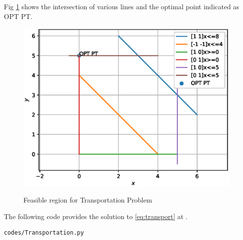 \begin{enumerate}[label=\arabic*.,ref=\thesection.\theenumi]
Fig  \ref{fig:transport}
shows the intersection of various lines and the optimal point indicated as OPT PT.
\begin{figure}[h]
\includegraphics[width=\columnwidth]{./figs/lp_transport.eps}
\caption{Feasible region for Transportation Problem}
\caption{}
\label{fig:transport}
\end{figure}

The following code provides the solution to \eqref{eq:transport} at .
%
\begin{lstlisting}
codes/Transportation.py
\end{lstlisting}





\end{enumerate}
%    
    
